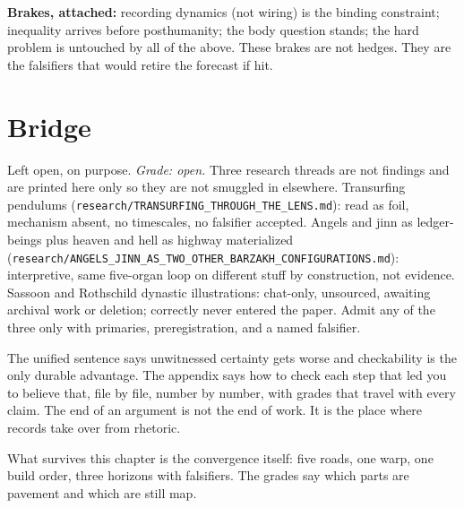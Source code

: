 \textbf{Brakes, attached:} recording dynamics (not wiring) is the binding constraint; inequality arrives before posthumanity; the body question stands; the hard problem is untouched by all of the above. These brakes are not hedges. They are the falsifiers that would retire the forecast if hit.

\section{Bridge}
\label{sec:ch10-bridge}

Left open, on purpose. \textit{Grade: open.} Three research threads are not findings and are printed here only so they are not smuggled in elsewhere. Transurfing pendulums (\texttt{research/TRANSURFING\_THROUGH\_THE\_LENS.md}): read as foil, mechanism absent, no timescales, no falsifier accepted. Angels and jinn as ledger-beings plus heaven and hell as highway materialized (\texttt{research/ANGELS\_JINN\_AS\_TWO\_OTHER\_BARZAKH\_CONFIGURATIONS.md}): interpretive, same five-organ loop on different stuff by construction, not evidence. Sassoon and Rothschild dynastic illustrations: chat-only, unsourced, awaiting archival work or deletion; correctly never entered the paper. Admit any of the three only with primaries, preregistration, and a named falsifier.

The unified sentence says unwitnessed certainty gets worse and checkability is the only durable advantage. The appendix says how to check each step that led you to believe that, file by file, number by number, with grades that travel with every claim. The end of an argument is not the end of work. It is the place where records take over from rhetoric.

What survives this chapter is the convergence itself: five roads, one warp, one build order, three horizons with falsifiers. The grades say which parts are pavement and which are still map.
